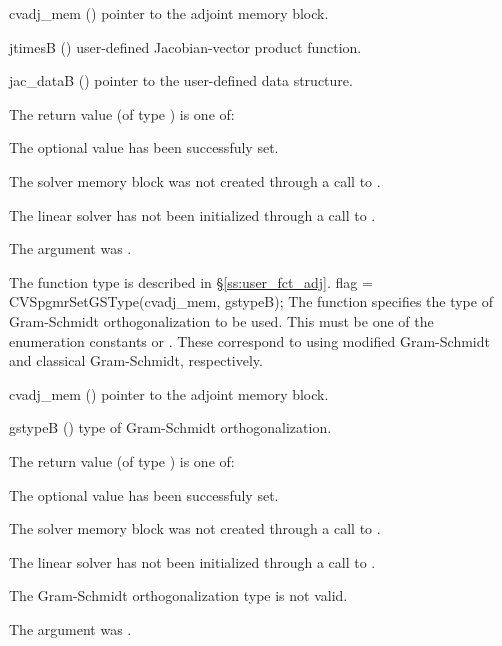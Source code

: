 {
  \begin{args}
  \item[cvadj\_mem] ()
    pointer to the adjoint memory block.
  \item[jtimesB] ()
    user-defined Jacobian-vector product function.
  \item[jac\_dataB] ()
    pointer to the user-defined data structure.
  \end{args}
}
{
  The return value  (of type ) is one of:
  \begin{args}
  \item[\Id{CVSPGMR\_SUCCESS}] 
    The optional value has been successfuly set.
  \item[\Id{CVSPGMR\_MEM\_NULL}]
    The {\cvodes} solver memory block was not created through a call to .
  \item[\Id{CVSPGMR\_LMEM\_NULL}]
    The {\cvspgmr} linear solver has not been initialized through a call to .
  \item[\Id{CVSPGMR\_ADJMEM\_NULL}]
    The  argument was .
  \end{args}
}
{
  The function type  is described in \S\ref{ss:user_fct_adj}.
}
{
  flag = CVSpgmrSetGSType(cvadj\_mem, gstypeB);
}
{
  The function  specifies the type of
  Gram-Schmidt orthogonalization to be used. 
  This must be one of the enumeration constants 
  or . These correspond to using modified Gram-Schmidt 
  and classical Gram-Schmidt, respectively. 
}
{
  \begin{args}
  \item[cvadj\_mem] ()
    pointer to the adjoint memory block.
  \item[gstypeB] ()
    type of Gram-Schmidt orthogonalization.
  \end{args}
}
{
  The return value  (of type ) is one of:
  \begin{args}
  \item[\Id{CVSPGMR\_SUCCESS}] 
    The optional value has been successfuly set.
  \item[\Id{CVSPGMR\_MEM\_NULL}]
    The {\cvodes} solver memory block was not created through a call to .
  \item[\Id{CVSPGMR\_LMEM\_NULL}]
    The {\cvspgmr} linear solver has not been initialized through a call to .
  \item[\Id{CVSPGMR\_ILL\_INPUT}]
    The Gram-Schmidt orthogonalization type  is not valid.
  \item[\Id{CVSPGMR\_ADJMEM\_NULL}]
    The  argument was .
  \end{args}
}
